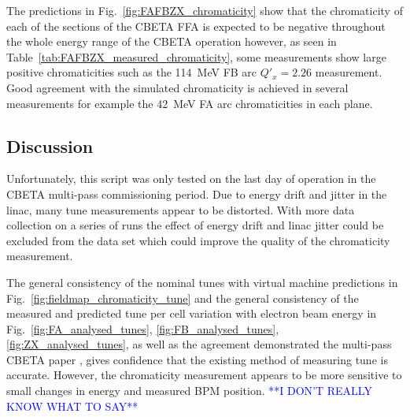 \documentclass[../main.tex]{subfiles}
\begin{document}
The predictions in Fig.~\ref{fig:FAFBZX_chromaticity} show that the chromaticity of each of the sections of the CBETA FFA is expected to be negative throughout the whole energy range of the CBETA operation however, as seen in Table~\ref{tab:FAFBZX_measured_chromaticity}, some measurements show large positive chromaticities such as the 114~\si{\mega\electronvolt} FB arc $Q'_{x} = 2.26$ measurement. Good agreement with the simulated chromaticity is achieved in several measurements for example the 42~\si{\mega\electronvolt} FA arc chromaticities in each plane.   

\subsection{Discussion}
\label{sec:chromaticity_discussion}

Unfortunately, this script was only tested on the last day of operation in the CBETA multi-pass commissioning period. Due to energy drift and jitter in the linac, many tune measurements appear to be distorted. With more data collection on a series of runs the effect of energy drift and linac jitter could be excluded from the data set which could improve the quality of the chromaticity measurement.

The general consistency of the nominal tunes with virtual machine predictions in Fig.~\ref{fig:fieldmap_chromaticity_tune} and the general consistency of the measured and predicted tune per cell variation with electron beam energy in Fig.~\ref{fig:FA_analysed_tunes}, \ref{fig:FB_analysed_tunes}, \ref{fig:ZX_analysed_tunes}, as well as the agreement demonstrated the multi-pass CBETA paper \cite{bartnik2020cbeta}, gives confidence that the existing method of measuring tune is accurate. However, the chromaticity measurement appears to be more sensitive to small changes in energy and measured BPM position. \textcolor{blue}{**I DON'T REALLY KNOW WHAT TO SAY**} 
\end{document}
